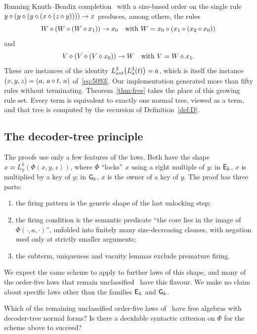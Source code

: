 \begin{remark}\label{rem:kb}
Running Knuth--Bendix completion~\cite{KnuthBendix} with a size-based order on
the single rule $y\mathbin{\diamond}(y\mathbin{\diamond}(y\mathbin{\diamond}(x\mathbin{\diamond}(z\mathbin{\diamond} y))))\to x$ produces, among others,
the rules
\[
 W\mathbin{\diamond}(W\mathbin{\diamond}(W\mathbin{\diamond} x_1))\to x_0 \quad\text{with }W=x_0\mathbin{\diamond}(x_1\mathbin{\diamond}(x_2\mathbin{\diamond} x_0))
\]
and
\[
 V\mathbin{\diamond}(V\mathbin{\diamond}(V\mathbin{\diamond} x_0))\to W\quad\text{with }V=W\mathbin{\diamond} x_1 .
\]
These are instances of the identity
$L_{a\mathbin{\diamond} t}^{3}\bigl(L_a^{3}(t)\bigr)=a$, which is itself the instance
$(x,y,z)=(a,\,a\mathbin{\diamond} t,\,a)$ of~\eqref{eq:5093}. Our implementation generated
more than fifty rules without terminating. Theorem~\ref{thm:free} takes the
place of this growing rule set. Every term is equivalent to exactly one normal
tree, viewed as a term, and that tree is computed by the recursion of
Definition~\ref{def:D}.
\end{remark}

\subsection{The decoder-tree principle}
The proofs use only a few features of the laws. Both have the shape
$x\approx L_y^{k}(\Phi(x,y,z))$, where $\Phi$ ``locks'' $x$ using a right
multiple of $y$: in $\mathsf{E}_{k}$, $x$ is multiplied by a key of $y$; in $\mathsf{G}_{k}$,
$x$ is the owner of a key of $y$. The proof has three parts:
\begin{enumerate}[label=(\arabic*)]
\item the firing pattern is the generic shape of the last unlocking step;
\item the firing condition is the semantic predicate ``the core lies in the
  image of $\Phi(\cdot,a,\cdot)$'', unfolded into finitely many
  size-decreasing clauses, with negation used only at strictly smaller
  arguments;
\item the subterm, uniqueness and vacuity lemmas exclude premature firing.
\end{enumerate}
We expect the same scheme to apply to further laws of this shape, and many of
the order-five laws that remain unclassified~\cite{ETPblueprint,ZWYM2026} have
this flavour. We make no claim about specific laws other than the families
$\mathsf{E}_{k}$ and $\mathsf{G}_{k}$.

\begin{question}
Which of the remaining unclassified order-five laws of~\cite{ETPblueprint}
have free algebras with decoder-tree normal forms? Is there a decidable
syntactic criterion on $\Phi$ for the scheme above to succeed?
\end{question}

